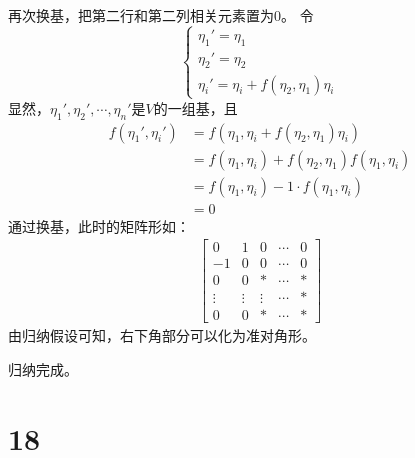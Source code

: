 \documentclass{article}
\begin{document}
再次换基，把第二行和第二列相关元素置为0。
令
\begin{equation*}
  \begin{cases*}
    \eta_1' = \eta_1 \\
    \eta_2' = \eta_2 \\
    \eta_i' = \eta_i + f(\eta_2, \eta_1) \eta_i
  \end{cases*}
\end{equation*}
显然，$\eta_1', \eta_2', \cdots, \eta_n'$是$V$的一组基，且
\begin{align*}
  f(\eta_1', \eta_i')
   & = f(\eta_1, \eta_i + f(\eta_2, \eta_1) \eta_i)            \\
   & = f(\eta_1, \eta_i) + f(\eta_2, \eta_1) f(\eta_1, \eta_i) \\
   & = f(\eta_1, \eta_i) - 1 \cdot f(\eta_1, \eta_i)           \\
   & = 0
\end{align*}
通过换基，此时的矩阵形如：
\begin{align*}
  \begin{bmatrix}
    0      & 1      & 0      & \cdots & 0 \\
    - 1    & 0      & 0      & \cdots & 0 \\
    0      & 0      & *      & \cdots & * \\
    \vdots & \vdots & \vdots & \cdots & * \\
    0      & 0      & *      & \cdots & *
  \end{bmatrix}
\end{align*}
由归纳假设可知，右下角部分可以化为准对角形。

归纳完成。

\section*{18}
\end{document}
